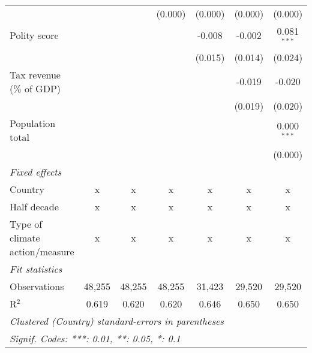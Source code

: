 \begin{tabular}{lcccccc}
                                                                              &               &                & (0.000)        & (0.000)        & (0.000)        & (0.000)\\   
   Polity score                                                               &               &                &                & -0.008         & -0.002         & 0.081$^{***}$\\   
                                                                              &               &                &                & (0.015)        & (0.014)        & (0.024)\\   
   Tax revenue (\% of GDP)                                                    &               &                &                &                & -0.019         & -0.020\\   
                                                                              &               &                &                &                & (0.019)        & (0.020)\\   
   Population total                                                           &               &                &                &                &                & 0.000$^{***}$\\   
                                                                              &               &                &                &                &                & (0.000)\\   
   \emph{Fixed effects}\\
   Country                                                                    & x             & x              & x              & x              & x              & x\\  
   Half decade                                                                & x             & x              & x              & x              & x              & x\\  
   Type of climate action/measure                                             & x             & x              & x              & x              & x              & x\\  
   \midrule \emph{Fit statistics}\\
   Observations                                                               & 48,255        & 48,255         & 48,255         & 31,423         & 29,520         & 29,520\\  
   R$^2$                                                                      & 0.619         & 0.620          & 0.620          & 0.646          & 0.650          & 0.650\\  
   \midrule
   \multicolumn{7}{l}{\emph{Clustered (Country) standard-errors in parentheses}}\\
   \multicolumn{7}{l}{\emph{Signif. Codes: ***: 0.01, **: 0.05, *: 0.1}}\\
\end{tabular}
\par\endgroup


